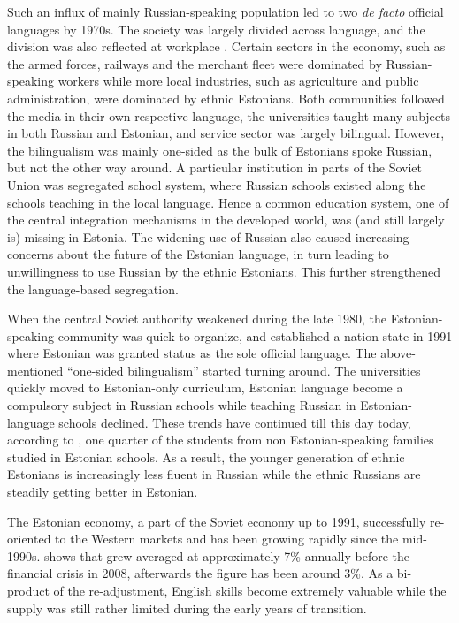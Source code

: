 \documentclass[12pt, a4paper]{article}
\begin{document}
Such an influx of mainly
Russian-speaking population
led to two \emph{de facto} official languages
by 1970s.
The society was largely divided across language, and the division was
also reflected at workplace \citep{leppik+vihalemm2015JofBaltStud}.
Certain sectors in the economy, such as the armed forces, railways and the
merchant fleet
were dominated by
Russian-speaking workers while more local industries,
such as agriculture and
public administration,
were dominated by ethnic Estonians.
Both communities followed the media in their own respective language, the
universities taught many subjects in both Russian and Estonian,
and service sector was largely bilingual.  However, the bilingualism
was mainly one-sided as the bulk of Estonians spoke Russian, but not
the other way around.  A particular institution in parts of the Soviet
Union was segregated school system, where Russian schools existed along the
schools teaching in the local language.  Hence a common education
system, one of the central integration mechanisms in the developed world,
was (and still largely is) missing in Estonia.
The widening use of Russian also
caused increasing concerns about the future of the Estonian
language, in turn leading to  unwillingness to use Russian by
the ethnic Estonians.  This further strengthened the language-based segregation.

When the central Soviet authority weakened during the late 1980, the
Estonian-speaking community was quick to organize, and established a
nation-state in 1991 where
Estonian was granted status as the sole official language.  The
above-mentioned ``one-sided bilingualism'' started turning
around.  The universities quickly moved to Estonian-only curriculum,
Estonian language become a compulsory subject in Russian schools
while teaching Russian in Estonian-language schools declined.
These trends have continued till this day today, according to
\citet{HTM2015}, one quarter of the students from non
Estonian-speaking families studied in Estonian schools.
As a result, the younger generation of ethnic Estonians is
increasingly less fluent in Russian while the ethnic Russians are
steadily getting better in Estonian.

The Estonian economy, a part of the Soviet economy up to 1991, successfully
re-oriented to the Western markets and has been growing rapidly since
the mid-1990s.  
 shows that grew averaged at approximately 7\%
annually
before the financial crisis in 2008, afterwards the figure has been around 3\%.
As a bi-product of the re-adjustment, English skills become extremely
valuable while the supply was still rather limited during the early
years of transition.
\end{document}
